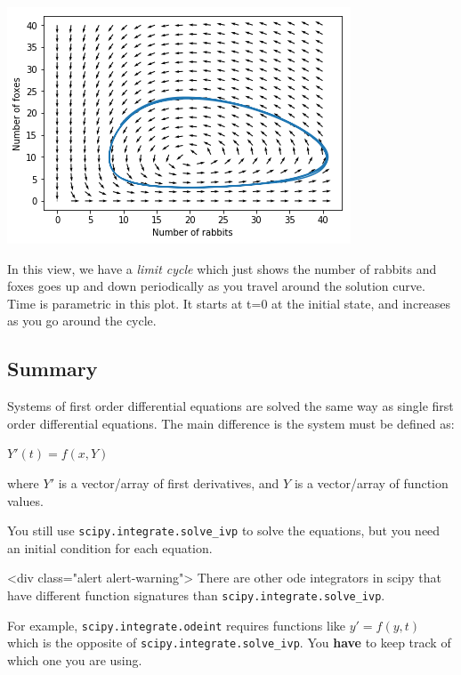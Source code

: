 \documentclass[11pt]{article}
\begin{document}
\begin{center}
\includegraphics[width=.9\linewidth]{obipy-resources/05b8b46ebbc2df3b9d545d77190f5234-68311ugx.png}
\end{center}

In this view, we have a \emph{limit cycle} which just shows the number of rabbits and foxes goes up and down periodically as you travel around the solution curve. Time is parametric in this plot. It starts at t=0 at the initial state, and increases as you go around the cycle.

\subsection{Summary}
\label{sec:org0bd9b3f}

Systems of first order differential equations are solved the same way as single first order differential equations. The main difference is the system must be defined as:

\(Y'(t) = f(x, Y)\)

where \(Y'\) is a vector/array of first derivatives, and \(Y\) is a vector/array of function values.

You still use \texttt{scipy.integrate.solve\_ivp} to solve the equations, but you need an initial condition for each equation.

<div class="alert alert-warning">
There are other ode integrators in scipy that have different function signatures than \texttt{scipy.integrate.solve\_ivp}.

For example, \texttt{scipy.integrate.odeint} requires functions like \(y' = f(y, t)\) which is the opposite of \texttt{scipy.integrate.solve\_ivp}. You \textbf{have} to keep track of which one you are using.
\end{document}
